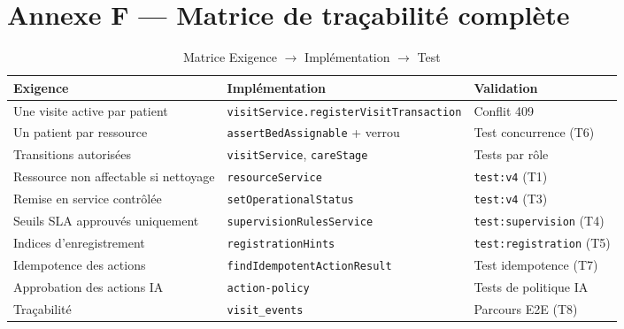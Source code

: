 \section{Annexe F — Matrice de traçabilité complète}

\begin{table}[H]
\centering
\caption{Matrice Exigence $\rightarrow$ Implémentation $\rightarrow$ Test}
\label{tab:matrice_complete}
\small
\begin{tabular}{|p{3.8cm}|p{5cm}|p{4.4cm}|}
\hline
\textbf{Exigence} & \textbf{Implémentation} & \textbf{Validation} \\
\hline
Une visite active par patient & \texttt{visitService.registerVisitTransaction} & Conflit 409 \\
\hline
Un patient par ressource & \texttt{assertBedAssignable} + verrou & Test concurrence (T6) \\
\hline
Transitions autorisées & \texttt{visitService}, \texttt{careStage} & Tests par rôle \\
\hline
Ressource non affectable si nettoyage & \texttt{resourceService} & \texttt{test:v4} (T1) \\
\hline
Remise en service contrôlée & \texttt{setOperationalStatus} & \texttt{test:v4} (T3) \\
\hline
Seuils SLA approuvés uniquement & \texttt{supervisionRulesService} & \texttt{test:supervision} (T4) \\
\hline
Indices d'enregistrement & \texttt{registrationHints} & \texttt{test:registration} (T5) \\
\hline
Idempotence des actions & \texttt{findIdempotentActionResult} & Test idempotence (T7) \\
\hline
Approbation des actions IA & \texttt{action-policy} & Tests de politique IA \\
\hline
Traçabilité & \texttt{visit\_events} & Parcours E2E (T8) \\
\hline
\end{tabular}
\end{table}

